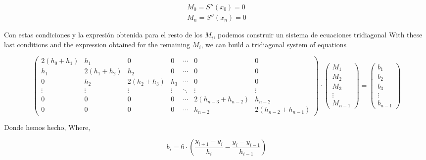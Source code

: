 \begin{align*}
M_0=S''(x_0)=0\\
M_n=S''(x_n)=0
\end{align*}
\begin{paracol}{2}
Con estas condiciones y la expresión obtenida para el resto de los $M_i$, podemos construir un sistema de ecuaciones tridiagonal
\switchcolumn
With these last conditions and the expression obtained for the remaining $M_i$, we can build a tridiagonal system of equations
\end{paracol}
\begin{equation*}
\begin{pmatrix}
2(h_0+h_1) & h_1 & 0 &0&\cdots &0&0\\
 h_1 & 2(h_1+h_2) & h_2 &0& \cdots&0 & 0\\
0& h_2 & 2(h_2+h_3) & h_3 &\cdots &0& 0\\
\vdots & \vdots & \vdots &\vdots& \ddots & \vdots&\vdots \\
0 & 0 & 0&0&\cdots& 2(h_{n-3}+h_{n-2}) & h_{n-2} \\ 
0 & 0 & 0&0&\cdots&h_{n-2} & 2(h_{n-2}+h_{n-1})
\end{pmatrix}\cdot \begin{pmatrix}
M_1\\
M_2\\
M_3\\
\vdots \\
M_{n-1}
\end{pmatrix}=\begin{pmatrix}
b_1\\
b_2\\
b_3\\
\vdots \\
b_{n-1}
\end{pmatrix}
\end{equation*}
\begin{paracol}{2}
Donde hemos hecho,
\switchcolumn
Where,
\end{paracol}
\begin{equation*}
b_i=6\cdot \left(\frac{y_{i+1}-y_i}{h_i}-\frac{y_i-y_{i-1}}{h_{i-1}}\right)
\end{equation*}
